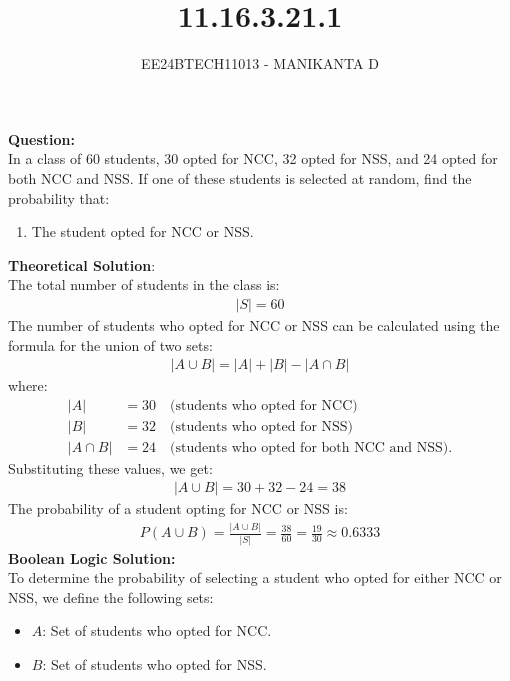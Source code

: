 \documentclass[journal]{IEEEtran}
\begin{document}

\vspace{3cm}

\title{11.16.3.21.1}
\author{EE24BTECH11013 - MANIKANTA D}
{\let\newpage\relax\maketitle}

\renewcommand{\thefigure}{\theenumi}
\renewcommand{\thetable}{\theenumi}
\setlength{\intextsep}{10pt} %

\renewcommand{\thetable}{\theenumi}

\textbf{Question:}\\
In a class of 60 students, 30 opted for NCC, 32 opted for NSS, and 24 opted for both NCC and NSS. If one of these students is selected at random, find the probability that:
\begin{enumerate}
    \item The student opted for NCC or NSS.
\end{enumerate}

\textbf{Theoretical Solution}:\\
The total number of students in the class is:
\begin{align}
    |S| = 60
\end{align}
The number of students who opted for NCC or NSS can be calculated using the formula for the union of two sets:
\begin{align}
    |A \cup B| = |A| + |B| - |A \cap B|
\end{align}
where:
\begin{align}
    |A| &= 30 \quad \text{(students who opted for NCC)} \\
    |B| &= 32 \quad \text{(students who opted for NSS)} \\
    |A \cap B| &= 24 \quad \text{(students who opted for both NCC and NSS)}.
\end{align}
Substituting these values, we get:
\begin{align}
    |A \cup B| = 30 + 32 - 24 = 38
\end{align}
The probability of a student opting for NCC or NSS is:
\begin{align}
    P(A \cup B) = \frac{|A \cup B|}{|S|} = \frac{38}{60} = \frac{19}{30} \approx 0.6333
\end{align}
\textbf{Boolean Logic Solution:}\\
To determine the probability of selecting a student who opted for either NCC or NSS, we define the following sets:
\begin{itemize}
    \item \( A \): Set of students who opted for NCC.
    \item \( B \): Set of students who opted for NSS.
\end{itemize}
\end{document}
